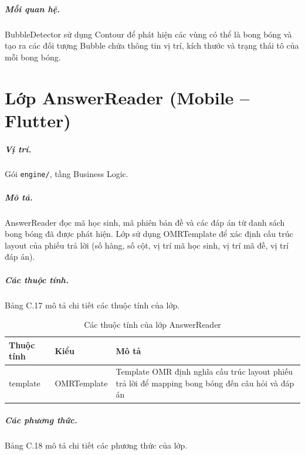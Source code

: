 \documentclass[../DoAn.tex]{subfiles}
\begin{document}
\subparagraph{Mối quan hệ.} BubbleDetector sử dụng Contour để phát hiện các vùng có thể là bong bóng và tạo ra các đối tượng Bubble chứa thông tin vị trí, kích thước và trạng thái tô của mỗi bong bóng.

\vspace{0.3cm}

\section{Lớp AnswerReader (Mobile -- Flutter)}
\label{appendix:answer_reader}

\subparagraph{Vị trí.} Gói \texttt{engine/}, tầng Business Logic.

\subparagraph{Mô tả.} AnswerReader đọc mã học sinh, mã phiên bản đề và các đáp án từ danh sách bong bóng đã được phát hiện. Lớp sử dụng OMRTemplate để xác định cấu trúc layout của phiếu trả lời (số hàng, số cột, vị trí mã học sinh, vị trí mã đề, vị trí đáp án).

\subparagraph{Các thuộc tính.} Bảng C.17 mô tả chi tiết các thuộc tính của lớp.

\begin{table}[H]
\centering
\begin{tabular}{|p{4cm}|p{3.5cm}|p{5cm}|}
\hline
\textbf{Thuộc tính} & \textbf{Kiểu} & \textbf{Mô tả} \\ \hline
template & OMRTemplate & Template OMR định nghĩa cấu trúc layout phiếu trả lời để mapping bong bóng đến câu hỏi và đáp án \\ \hline
\end{tabular}
\caption{Các thuộc tính của lớp AnswerReader}
\label{table:answer_reader_attrs}
\end{table}

\subparagraph{Các phương thức.} Bảng C.18 mô tả chi tiết các phương thức của lớp.
\end{document}

